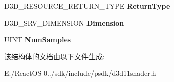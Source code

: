 \begin{DoxyCompactItemize}
D3\+D\+\_\+\+R\+E\+S\+O\+U\+R\+C\+E\+\_\+\+R\+E\+T\+U\+R\+N\+\_\+\+T\+Y\+PE {\bfseries Return\+Type}
\item 
\mbox{\label{struct___d3_d11___s_h_a_d_e_r___i_n_p_u_t___b_i_n_d___d_e_s_c_a1205e57c48e8ed2798ceafd386706732}} 
D3\+D\+\_\+\+S\+R\+V\+\_\+\+D\+I\+M\+E\+N\+S\+I\+ON {\bfseries Dimension}
\item 
\mbox{\label{struct___d3_d11___s_h_a_d_e_r___i_n_p_u_t___b_i_n_d___d_e_s_c_a211a27108cf8cc85bed8d2128c4f60e1}} 
U\+I\+NT {\bfseries Num\+Samples}
\end{DoxyCompactItemize}


该结构体的文档由以下文件生成\+:\begin{DoxyCompactItemize}
\item 
E\+:/\+React\+O\+S-\/0../sdk/include/psdk/d3d11shader.\+h\end{DoxyCompactItemize}
